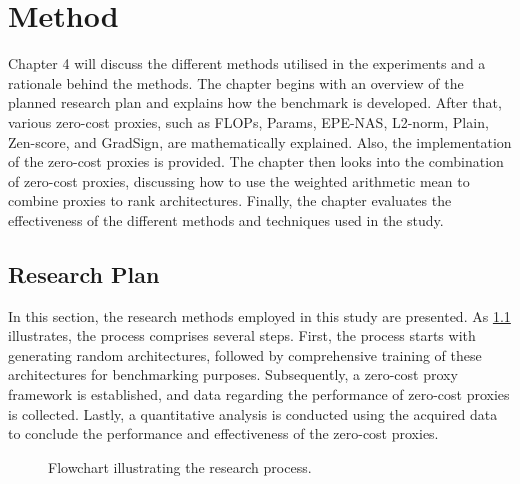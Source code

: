 \chapter{Method}\label{method}
Chapter 4 will discuss the different methods utilised in the experiments and a rationale behind the methods. The chapter begins with an overview of the planned research plan and explains how the benchmark is developed. After that, various zero-cost proxies, such as \gls{FLOPs}, Params, EPE-NAS, L2-norm, Plain, Zen-score, and GradSign, are mathematically explained. Also, the implementation of the zero-cost proxies is provided. The chapter then looks into the combination of zero-cost proxies, discussing how to use the weighted arithmetic mean to combine proxies to rank architectures. Finally, the chapter evaluates the effectiveness of the different methods and techniques used in the study.

\section{Research Plan}
In this section, the research methods employed in this study are presented. As \cref{fig:research_flowchart} illustrates, the process comprises several steps. First, the process starts with generating random architectures, followed by comprehensive training of these architectures for benchmarking purposes. Subsequently, a zero-cost proxy framework is established, and data regarding the performance of zero-cost proxies is collected. Lastly, a quantitative analysis is conducted using the acquired data to conclude the performance and effectiveness of the zero-cost proxies. 
\clearpage

\begin{figure}[htbp]
\centering
{}
\caption{Flowchart illustrating the research process.}
\label{fig:research_flowchart}
\end{figure}







